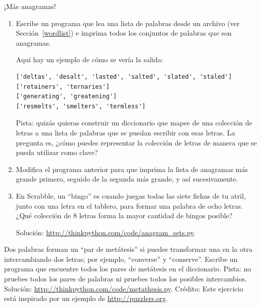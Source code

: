 \documentclass[10pt]{book}
\begin{document}
\begin{exercise}
\label{anagrams}

¡Más anagramas!

\begin{enumerate}

\item Escribe un programa
que lea una lista de palabras desde un archivo (ver Sección~\ref{wordlist}) e
imprima todos los conjuntos de palabras que son anagramas.

Aquí hay un ejemplo de cómo se vería la salida:

\begin{verbatim}
['deltas', 'desalt', 'lasted', 'salted', 'slated', 'staled']
['retainers', 'ternaries']
['generating', 'greatening']
['resmelts', 'smelters', 'termless']
\end{verbatim}
%
Pista: quizás quieras construir un diccionario que mapee de una
colección de letras a una lista de palabras que se puedan escribir con esas
letras.  La pregunta es, ¿cómo puedes representar la colección de
letras de manera que se pueda utilizar como clave?

\item Modifica el programa anterior para que imprima la lista de anagramas
más grande primero, seguido de la segunda más grande, y así sucesivamente.

\item En Scrabble, un ``bingo'' es cuando juegas todas las siete fichas de
tu atril, junto con una letra en el tablero, para formar una palabra de ocho
letras.  ¿Qué colección de 8 letras forma la mayor cantidad de bingos posible?


Solución: \url{http://thinkpython.com/code/anagram_sets.py}.

\end{enumerate}
\end{exercise}

\begin{exercise}

Dos palabras forman un ``par de metátesis'' si puedes transformar una en la
otra intercambiando dos letras; por ejemplo, ``converse'' y
``conserve''.  Escribe un programa que encuentre todos los pares de metátesis
en el diccionario.  Pista: no pruebes todos los pares de palabras ni
pruebes todos los posibles intercambios.  Solución:
\url{http://thinkpython.com/code/metathesis.py}.  Crédito: Este
ejercicio está inspirado por un ejemplo de \url{http://puzzlers.org}.

\end{exercise}
\end{document}
